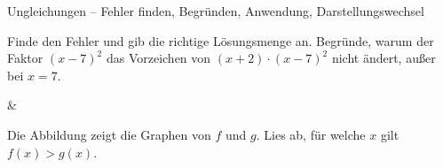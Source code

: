 \begin{aufgabe}{Ungleichungen – Fehler finden, Begründen, Anwendung, Darstellungswechsel}
\begin{teile}
\teil Finde den Fehler und gib die richtige Lösungsmenge an. 
\teil Begründe, warum der Faktor $(x - 7)^2$ das Vorzeichen von $(x + 2) \cdot (x - 7)^2$ nicht ändert, außer bei $x = 7$.
\end{teile}
\begin{gleichungsraster}[2]
 &
\end{gleichungsraster}
\begin{teile}
\teil Die Abbildung zeigt die Graphen von $f$ und $g$. Lies ab, für welche $x$ gilt $f(x) > g(x)$.

\begin{ksys}[xmin=-3,xmax=5,ymin=-1,ymax=5,ablesen]   \end{ksys}
\leerfeld
\end{teile}
\end{aufgabe}
